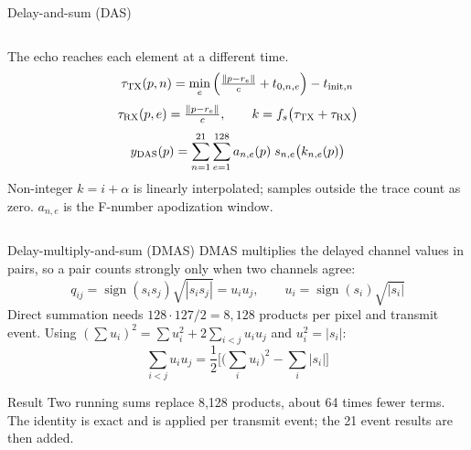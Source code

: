 \documentclass[aspectratio=169,10pt]{beamer}
\begin{document}
\begin{frame}{Delay-and-sum (DAS)}
  \begin{columns}[T,onlytextwidth]
    \centering

    {\small The echo reaches each element at a different time.}
    \small
    \vspace{-.5em}
    \[
      \tau_{\rm TX}(p,n)=\min_e\Big(\tfrac{\|p-r_e\|}{c}+t_{0,n,e}\Big)-t_{{\rm init},n}
    \]
    \[
      \tau_{\rm RX}(p,e)=\tfrac{\|p-r_e\|}{c},\qquad k=f_s\big(\tau_{\rm TX}+\tau_{\rm RX}\big)
    \]
    \[
      y_{\rm DAS}(p)=\sum_{n=1}^{21}\sum_{e=1}^{128} a_{n,e}(p)\; s_{n,e}\big(k_{n,e}(p)\big)
    \]
    Non-integer $k=i+\alpha$ is linearly interpolated; samples outside the trace count as zero. $a_{n,e}$ is the F-number apodization window.
  \end{columns}
\end{frame}

\begin{frame}{Delay-multiply-and-sum (DMAS)}
  \small
  DMAS multiplies the delayed channel values in pairs, so a pair counts strongly only when two channels agree:
  \[
    q_{ij}=\operatorname{sign}(s_is_j)\sqrt{|s_is_j|}=u_iu_j,\qquad u_i=\operatorname{sign}(s_i)\sqrt{|s_i|}
  \]
  Direct summation needs $128\cdot127/2=8{,}128$ products per pixel and transmit event. Using $(\sum u_i)^2=\sum u_i^2+2\sum_{i<j}u_iu_j$ and $u_i^2=|s_i|$:
  \[
    \sum_{i<j}u_iu_j=\frac12\Big[\Big(\sum_i u_i\Big)^2-\sum_i|s_i|\Big]
  \]
  \begin{block}{Result}
    Two running sums replace 8,128 products, about 64 times fewer terms. The identity is exact and is applied per transmit event; the 21 event results are then added.
  \end{block}
\end{frame}
\end{document}
